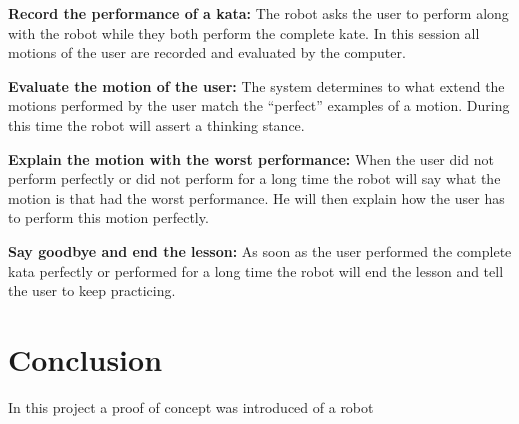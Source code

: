 \documentclass[10pt,a4paper,oneside]{scrartcl}
\begin{document}
\textbf{Record the performance of a kata:} 
The robot asks the user to perform along with the robot while they both perform the complete kate. 
In this session all motions of the user are recorded and evaluated by the computer. 

\textbf{Evaluate the motion of the user:}
The system determines to what extend the motions performed by the user match the ``perfect'' examples of a motion. 
During this time the robot will assert a thinking stance. 

\textbf{Explain the motion with the worst performance:}
When the user did not perform perfectly or did not perform for a long time the robot will say what the motion is that had the worst performance. 
He will then explain how the user has to perform this motion perfectly. 

\textbf{Say goodbye and end the lesson:}
As soon as the user performed the complete kata perfectly or performed for a long time the robot will end the lesson and tell the user to keep practicing. 


\section{Conclusion}
In this project a proof of concept was introduced of a robot  


\printbibliography
\end{document}
